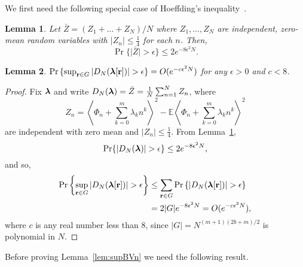 \documentclass[aap]{imsart}
\newcommand{\prob}{\operatorname{Pr}}
\newcommand{\expect}{{\mathbb E}}
\newcommand{\fracpart}[1]{\left\langle #1 \right\rangle}
\newcommand{\abs}[1]{\left\vert #1 \right\vert}
\newcommand{\sabs}[1]{\vert #1 \vert}
\newtheorem{lemma}{Lemma}
\newcommand{\cubr}[1]{{\left\{ #1 \right\}}}
\newcommand{\scubr}[1]{{\{ #1 \}}}
\begin{document}
We first need the following special case of Hoeffding's inequality~\cite{Hoeffding_inequality_1963}.

\begin{lemma} \label{lem:zero_mean_indepent_sum_bound}
  Let $\bar{Z} = (Z_1 + \dots + Z_N)/N$ where $Z_1, \dots, Z_N$ are independent, zero-mean random variables with $|Z_n| \leq \tfrac{1}{4}$ for each $n$.  Then,
\[
  \prob\{ \sabs{\bar{Z}} > \epsilon \} \leq 2e^{ - 8 \epsilon^2 N}.
\]
\end{lemma}

\begin{lemma}\label{lem:supVjk}
$\prob\cubr{   \sup_{\rbf \in G}\abs{ D_N(\lambdabf[\rbf])  } > \epsilon } = O(e^{-c \epsilon^2 N})$ for any $\epsilon > 0$ and $c < 8$.
\end{lemma}
 \begin{proof}
Fix $\boldsymbol{\lambda}$ and write $D_N(\boldsymbol{\lambda}) = \bar{Z} = \frac{1}{N}  \sum_{n=1}^{N}Z_{n}$, where
 \[
 Z_{n}=\fracpart{  \Phi_n+\sum_{k = 0}^{m}{\lambda_k n^k} }^{2} - \expect \fracpart{  \Phi_n + \sum_{k = 0}^{m}{\lambda_k n^k} }^{2}
 \]
 are independent with zero mean and $\abs{Z_n} \leq \tfrac{1}{4}$. From Lemma~\ref{lem:zero_mean_indepent_sum_bound},
 \[
  \prob\{ \abs{D_N(\lambdabf)} > \epsilon \} \leq 2e^{ - 8 \epsilon^2 N},
 \]
and so,
 \begin{align*}
 \prob\cubr{  \sup_{\rbf\in G}\left\vert D_N(\lambdabf[\rbf]) \right\vert >\epsilon }  &\leq \sum_{\rbf \in G} \prob\scubr{  \left\vert D_N(\lambdabf[\rbf])  \right\vert >\epsilon } \nonumber \\
&= 2 |G| e^{ - 8 \epsilon^2 N} = O(e^{-c \epsilon^2 N}), \label{eq:betaprobconv}
\end{align*}
where $c$ is any real number less than $8$, since $|G| = N^{(m+1)(2b + m)/2}$ is polynomial in $N$.
\end{proof}

Before proving Lemma~\ref{lem:supBVn} we need the following result.
\end{document}
